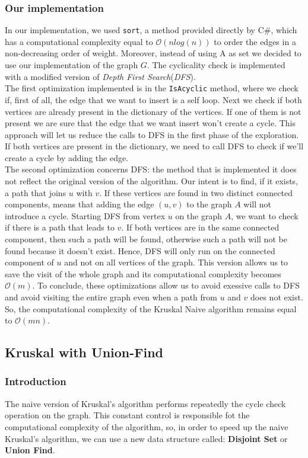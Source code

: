 \subsubsection{Our implementation}
In our implementation, we used \verb|sort|, a method provided directly by C\#, which has a computational complexity equal to $\mathcal{O}(n log(n))$ to order the edges in a non-decreasing order of weight.
Moreover, instead of using A as set we decided to use our implementation of the graph $G$.
The cyclicality check is implemented with a modified version of \textit{Depth First Search}(\textit{DFS}).\\
The first optimization implemented is in the \verb|IsAcyclic| method, where we check if, first of all, the edge that we want 
to insert is a self loop. Next we check if both vertices are already present in the dictionary of the vertices.
If one of them is not present we are sure that the edge that we want insert won't create a cycle.
This approach will let us reduce the calls to DFS in the first phase of the exploration.
If both vertices are present in the dictionary, we need to call DFS to check if we'll create a cycle by adding the edge.\\
The second optimization concerns DFS: the method that is implemented it does not reflect the original version 
of the algorithm. Our intent is to find, if it exists, a path that joins $u$ with $v$. If these vertices are found 
in two distinct connected components, means that adding the edge $(u, v)$ to the graph $A$ will not introduce a cycle. 
Starting DFS from vertex $u$ on the graph $A$, we want to check if there is a path that leads to $v$.
If both vertices are in the same connected component, then such a path will be found, otherwise such a path will 
not be found because it doesn't exist. Hence, DFS will only run on the connected component of $u$ and not on all 
vertices of the graph. This version allows us to save the visit of the whole graph and its computational complexity 
becomes $\mathcal{O}(m)$. To conclude, these optimizations allow us to avoid exessive calls to DFS and avoid visiting the entire
graph even when a path from $u$ and $v$ does not exist. So, the computational complexity of the Kruskal Naive algorithm remains equal to $\mathcal{O}(mn)$.

\subsection{Kruskal with Union-Find}

\subsubsection{Introduction}
The naive version of Kruskal's algorithm performs repeatedly the cycle check operation on the graph. 
This constant control is responsible fot the computational complexity of the algorithm, so, in order to speed up the 
naive Kruskal's algorithm, we can use a new data structure called: \textbf{Disjoint Set} or \textbf{Union Find}.\\

